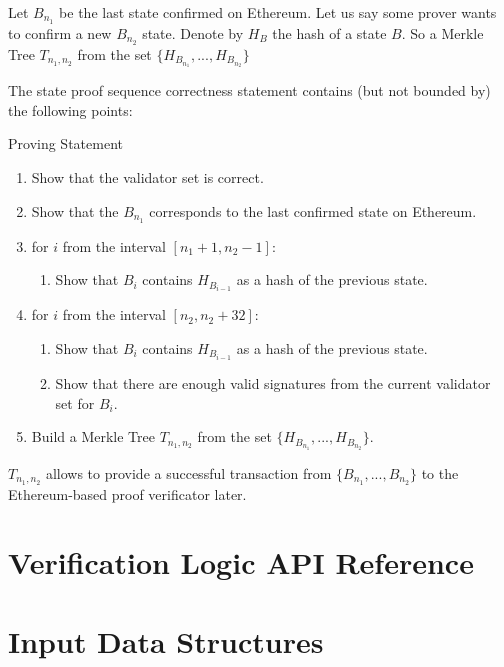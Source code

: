 Let $B_{n_1}$ be the last state confirmed on Ethereum. Let us say some prover 
wants to confirm a new $B_{n_2}$ state. Denote by $H_{B}$ the hash of a state $B$.
So a Merkle Tree $T_{n_1, n_2}$ from the set $\{H_{B_{n_1}}, ..., H_{B_{n_2}}\}$


The state proof sequence correctness statement contains (but not bounded by) the following points:
\begin{algorithm}
    \caption{Proving Statement}
    \label{circuit}
    \begin{enumerate}
        \item Show that the validator set is correct.
        \item Show that the $B_{n_1}$ corresponds to the last confirmed state on Ethereum.
        \item for $i$ from the interval $[n_1 + 1, n_2 - 1]$:
        \begin{enumerate}
            \item Show that $B_{i}$ contains $H_{B_{i - 1}}$ as a hash of the previous state.
        \end{enumerate}
        \item for $i$ from the interval $[n_2, n_2 + 32]$:
        \begin{enumerate}
            \item Show that $B_{i}$ contains $H_{B_{i - 1}}$ as a hash of the previous state.
            \item Show that there are enough valid signatures from the current validator set for $B_{i}$.
        \end{enumerate}
        \item Build a Merkle Tree $T_{n_1, n_2}$ from the set $\{H_{B_{n_1}}, ..., H_{B_{n_2}}\}$.
    \end{enumerate}
\end{algorithm}

$T_{n_1, n_2}$ allows to provide a successful transaction from $\{B_{n_1}, ..., B_{n_2}\}$ to the Ethereum-based proof verificator later.

\section{Verification Logic API Reference}

\section{Input Data Structures}
